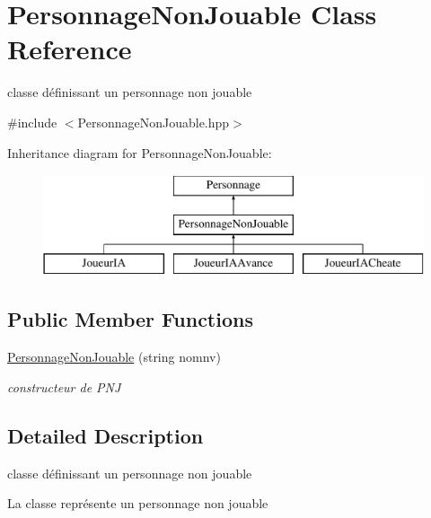 \hypertarget{classPersonnageNonJouable}{\section{Personnage\-Non\-Jouable Class Reference}
\label{classPersonnageNonJouable}
}


classe définissant un personnage non jouable  




{\ttfamily \#include $<$Personnage\-Non\-Jouable.\-hpp$>$}

Inheritance diagram for Personnage\-Non\-Jouable\-:\begin{figure}[H]
\begin{center}
\leavevmode
\includegraphics[height=3.000000cm]{classPersonnageNonJouable}
\end{center}
\end{figure}
\subsection*{Public Member Functions}
\begin{DoxyCompactItemize}
\item 
\hyperlink{classPersonnageNonJouable_ac647e57fa08d14e0ce334702bdbe38f1}{Personnage\-Non\-Jouable} (string nomnv)
\begin{DoxyCompactList}\small\item\em constructeur de P\-N\-J \end{DoxyCompactList}\end{DoxyCompactItemize}


\subsection{Detailed Description}
classe définissant un personnage non jouable 

La classe représente un personnage non jouable 

